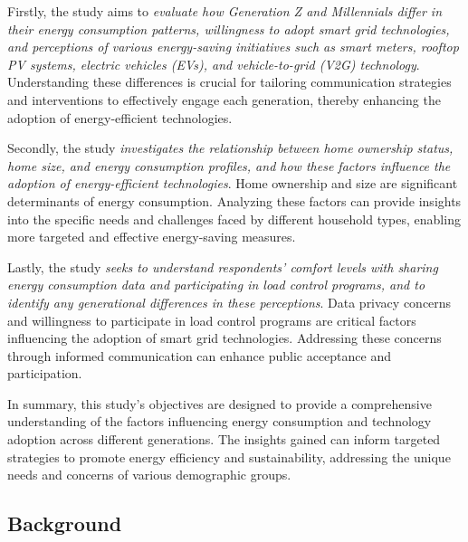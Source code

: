 \documentclass[
  letterpaper,
  DIV=11,
  numbers=noendperiod]{scrartcl}
\begin{document}
Firstly, the study aims to \emph{evaluate how Generation Z and
Millennials differ in their energy consumption patterns, willingness to
adopt smart grid technologies, and perceptions of various energy-saving
initiatives such as smart meters, rooftop PV systems, electric vehicles
(EVs), and vehicle-to-grid (V2G) technology}. Understanding these
differences is crucial for tailoring communication strategies and
interventions to effectively engage each generation, thereby enhancing
the adoption of energy-efficient technologies.

Secondly, the study \emph{investigates the relationship between home
ownership status, home size, and energy consumption profiles, and how
these factors influence the adoption of energy-efficient technologies}.
Home ownership and size are significant determinants of energy
consumption. Analyzing these factors can provide insights into the
specific needs and challenges faced by different household types,
enabling more targeted and effective energy-saving measures.

Lastly, the study \emph{seeks to understand respondents' comfort levels
with sharing energy consumption data and participating in load control
programs, and to identify any generational differences in these
perceptions}. Data privacy concerns and willingness to participate in
load control programs are critical factors influencing the adoption of
smart grid technologies. Addressing these concerns through informed
communication can enhance public acceptance and participation.

In summary, this study's objectives are designed to provide a
comprehensive understanding of the factors influencing energy
consumption and technology adoption across different generations. The
insights gained can inform targeted strategies to promote energy
efficiency and sustainability, addressing the unique needs and concerns
of various demographic groups.

\subsection{Background}\label{background}
\end{document}
